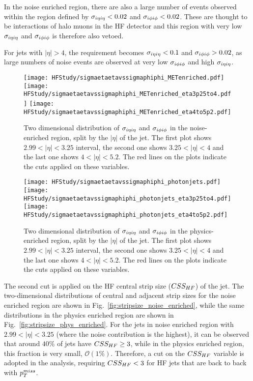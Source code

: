 In the noise enriched region, there are also a large number of events observed within the region defined by $\sigma_{i\eta i\eta} < 0.02$ and $\sigma_{i\phi i\phi} < 0.02$. 
These are thought to be interactions of halo muons in the HF detector and this region with very low $\sigma_{i\eta i\eta}$ and $\sigma_{i\phi i\phi}$ is therefore also vetoed. 

For jets with $|\eta| > 4$, the requirement becomes $\sigma_{i\eta i\eta} < 0.1$ and $\sigma_{i\phi i\phi} > 0.02$, as large numbers of noise events are observed at very low
$\sigma_{i\phi i\phi}$ and high $\sigma_{i\eta i\eta}$.

\begin{figure}
    \centering
    \texttt{[image: HFStudy/sigmaetaetavssigmaphiphi\_METenriched.pdf]}
    \texttt{[image: HFStudy/sigmaetaetavssigmaphiphi\_METenriched\_eta3p25to4.pdf]}
    \texttt{[image: HFStudy/sigmaetaetavssigmaphiphi\_METenriched\_eta4to5p2.pdf]}
    \caption{Two dimensional distribution of $\sigma_{i\eta i\eta}$ and $\sigma_{i\phi i\phi}$ in the noise-enriched region, split by the $|\eta|$ of the jet. The first plot shows 
    $2.99 < |\eta| < 3.25$ interval, the second one shows $3.25 < |\eta| < 4$ and the last one shows $4 < |\eta| < 5.2$. The red lines on the plots indicate
    the cuts applied on these variables.}
    \label{fig:sieie_sipip_noise_enriched}
\end{figure}

\begin{figure}
    \centering
    \texttt{[image: HFStudy/sigmaetaetavssigmaphiphi\_photonjets.pdf]}
    \texttt{[image: HFStudy/sigmaetaetavssigmaphiphi\_photonjets\_eta3p25to4.pdf]}
    \texttt{[image: HFStudy/sigmaetaetavssigmaphiphi\_photonjets\_eta4to5p2.pdf]}
    \caption{Two dimensional distribution of $\sigma_{i\eta i\eta}$ and $\sigma_{i\phi i\phi}$ in the physics-enriched region, split by the $|\eta|$ of the jet. The first plot shows 
    $2.99 < |\eta| < 3.25$ interval, the second one shows $3.25 < |\eta| < 4$ and the last one shows $4 < |\eta| < 5.2$. The red lines on the plots indicate
    the cuts applied on these variables.}
    \label{fig:sieie_sipip_physics_enriched}
\end{figure}

The second cut is applied on the HF central strip size ($CSS_{HF}$) of the jet. The two-dimensional distributions of central and adjacent strip sizes for the noise enriched
region are shown in Fig.~\ref{fig:stripsize_noise_enriched}, while the same distributions in the physics enriched region are shown in Fig.~\ref{fig:stripsize_phys_enriched}.
For the jets in noise enriched region with $2.99 < |\eta| < 3.25$ (where the noise contribution is the highest), it can be observed that around $40\%$ of jets
have $CSS_{HF} \geq 3$, while in the physics enriched region, this fraction is very small, $\mathcal{O}(1\%)$. Therefore, a cut on the $CSS_{HF}$ variable is adopted in 
the analysis, requiring $CSS_{HF} < 3$ for HF jets that are back to back with $p_T^{miss}$. 

